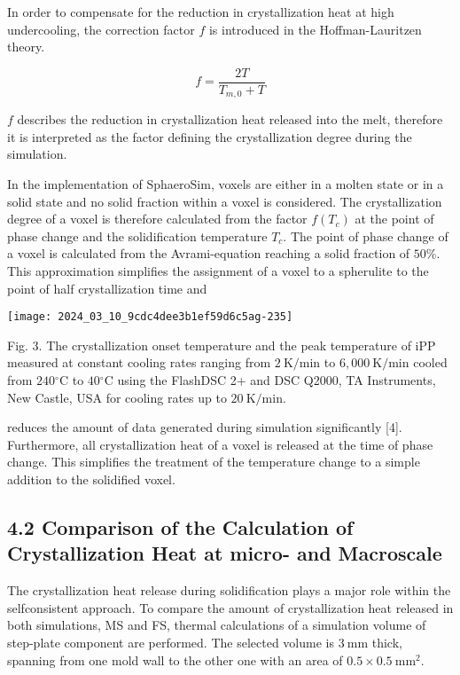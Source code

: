 \documentclass[10pt]{article}
\begin{document}
In order to compensate for the reduction in crystallization heat at high undercooling, the correction factor $f$ is introduced in the Hoffman-Lauritzen theory.


\begin{equation*}
f=\frac{2 T}{T_{m, 0}+T} \tag{8}
\end{equation*}


$f$ describes the reduction in crystallization heat released into the melt, therefore it is interpreted as the factor defining the crystallization degree during the simulation.

In the implementation of SphaeroSim, voxels are either in a molten state or in a solid state and no solid fraction within a voxel is considered. The crystallization degree of a voxel is therefore calculated from the factor $f\left(T_{c}\right)$ at the point of phase change and the solidification temperature $T_{c}$. The point of phase change of a voxel is calculated from the Avrami-equation reaching a solid fraction of $50 \%$. This approximation simplifies the assignment of a voxel to a spherulite to the point of half crystallization time and

\begin{center}
\texttt{[image: 2024\_03\_10\_9cdc4dee3b1ef59d6c5ag-235]}
\end{center}

Fig. 3. The crystallization onset temperature and the peak temperature of iPP measured at constant cooling rates ranging from $2 \mathrm{~K} / \mathrm{min}$ to $6,000 \mathrm{~K} / \mathrm{min}$ cooled from $240{ }^{\circ} \mathrm{C}$ to $40{ }^{\circ} \mathrm{C}$ using the FlashDSC 2+ and DSC Q2000, TA Instruments, New Castle, USA for cooling rates up to $20 \mathrm{~K} / \mathrm{min}$.

reduces the amount of data generated during simulation significantly [4]. Furthermore, all crystallization heat of a voxel is released at the time of phase change. This simplifies the treatment of the temperature change to a simple addition to the solidified voxel.

\subsection*{4.2 Comparison of the Calculation of Crystallization Heat at micro- and Macroscale}
The crystallization heat release during solidification plays a major role within the selfconsistent approach. To compare the amount of crystallization heat released in both simulations, MS and FS, thermal calculations of a simulation volume of step-plate component are performed. The selected volume is $3 \mathrm{~mm}$ thick, spanning from one mold wall to the other one with an area of $0.5 \times 0.5 \mathrm{~mm}^{2}$.
\end{document}
